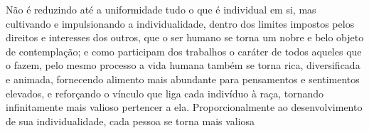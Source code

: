 %
Não é reduzindo até a uniformidade tudo o que é individual
em si, mas cultivando e impulsionando a individualidade, dentro dos
limites impostos pelos direitos e interesses dos outros, que o ser humano
se torna um nobre e belo objeto de contemplação; e como
participam dos trabalhos o caráter de todos aqueles que o fazem, pelo mesmo
processo a vida humana também se torna rica, diversificada e animada,
fornecendo alimento mais abundante para pensamentos e sentimentos elevados,
e reforçando o vínculo que liga cada indivíduo à raça,
tornando infinitamente mais valioso pertencer a ela. Proporcionalmente ao
desenvolvimento de sua individualidade, cada pessoa se torna mais valiosa
